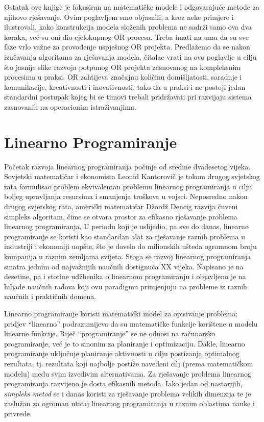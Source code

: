 \documentclass[a4paper, utf8, 11pt, colorlinks]{book}
\begin{document}
Ostatak ove knjige je fokusiran na  matematičke modele i odgovarajuće metode za njihovo rješavanje. Ovim poglavljem smo objasnili, a kroz neke primjere i ilustrovali, kako konstrukcija modela složenih problema ne sadrži samo ova dva koraka, već su oni  dio cjelokupnog OR procesa. Treba imati na umu da su sve faze vrlo važne za provođenje uspješnog OR projekta. Predlažemo da se nakon izučavanja algoritama za rješavanja modela, čitalac vrati na ovo poglavlje u cilju što jasnije slike razvoja potpunog OR projekta zasnovanog na kompleksnim procesima u praksi.  OR zahtijeva značajnu količinu domišljatosti, saradnje i komunikacije, kreativnosti i inovativnosti, tako da u praksi i ne postoji jedan standardni postupak kojeg bi se timovi trebali pridržavati pri razvijaju sistema zasnovanih na operacionim istraživanjima. %

\chapter{Linearno Programiranje} 
  
  Početak razvoja linearnog programiranja počinje od sredine dvadesetog vijeka. Sovjetski matematičar i ekonomista Leonid Kantorovič je tokom drugog svjetskog rata formulisao problem ekvivalentan problemu linearnog programiranja u cilju boljeg upravljanja resursima i smanjenja troškova u vojsci. Neposredno nakon drugog svjetskog rata, američki matematičar Džordž Dencig razvija čuveni simpleks algoritam, čime se otvara prostor za efikasno rješavanje problema linearnog programiranja. U periodu koji je uslijedio, pa sve do danas, linearno programiranje se koristi kao standardan alat za rješavanje raznih problema u industriji i ekonomiji uopšte, što je dovelo do   milionskih ušteda ogromnom broju kompanija u raznim zemljama svijeta. Stoga se 
razvoj linearnog programiranja  smatra jednim od najvažnijih naučnih dostignu\-ća XX vijeka.  Napisano je na desetine, pa i stotine udžbenika
o linearnom programiranju i objavljeno je na hiljade naučnih radova koji   ovu paradigmu primjenjuju na probleme iz raznih naučnih i praktičnih domena. 

Linearno programiranje koristi matematički model za opisivanje problema; 
pridjev ``linearno'' podrazumijeva da su  matematičke funkcije korištene u modelu linearne funkcije. Riječ ``programiranje'' se ne odnosi na računarsko programiranje, već je to sinonim za planiranje i optimizaciju. Dakle, linearno programiranje uključuje planiranje aktivnosti u cilju postizanja optimalnog rezultata, tj. rezultata koji najbolje postiže navedeni cilj (prema matematičkom modelu) među svim izvedivim alternativama.  Za rješavanje problema linearnog programiranja razvijeno je dosta efikasnih metoda. Iako jedan od nastarijih,  \emph{simpleks metod} se i danas koristi za rješavanje problema velikih dimenzija te je zaslužan za ogroman uticaj linearnog  programiranja u raznim oblastima nauke i privrede.
\end{document}
